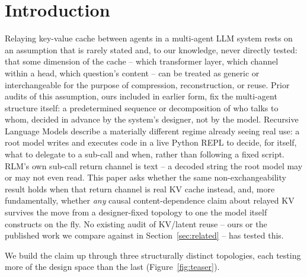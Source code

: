 \documentclass[11pt]{article}
\begin{document}
\section{Introduction}
\label{sec:intro}

Relaying key-value cache between agents in a multi-agent LLM system rests
on an assumption that is rarely stated and, to our knowledge, never
directly tested: that some dimension of the cache -- which transformer
layer, which channel within a head, which question's content -- can be
treated as generic or interchangeable for the purpose of compression,
reconstruction, or reuse. Prior audits of this assumption, ours included
in earlier form, fix the multi-agent structure itself: a predetermined
sequence or decomposition of who talks to whom, decided in advance by the
system's designer, not by the model. Recursive Language Models
\citep{rlm2026} describe a materially different regime already seeing
real use: a root model writes and executes code in a live Python REPL to
decide, for itself, what to delegate to a sub-call and when, rather than
following a fixed script. RLM's own sub-call return channel is
text -- a decoded string the root model may or may not even read. This
paper asks whether the same non-exchangeability result holds when that
return channel is real KV cache instead, and, more fundamentally, whether
\emph{any} causal content-dependence claim about relayed KV survives the
move from a designer-fixed topology to one the model itself constructs on
the fly. No existing audit of KV/latent reuse -- ours or the published
work we compare against in Section~\ref{sec:related} -- has tested this.

We build the claim up through three structurally distinct topologies,
each testing more of the design space than the last (Figure~\ref{fig:teaser}).
\end{document}
